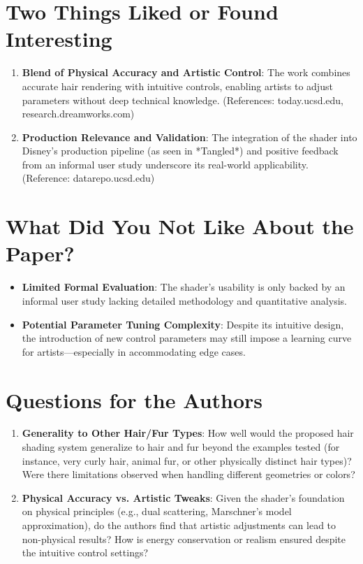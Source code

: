 \documentclass[12pt]{article}
\begin{document}
\section{Two Things Liked or Found Interesting}
\begin{enumerate}[noitemsep]
    \item \textbf{Blend of Physical Accuracy and Artistic Control}: The work combines accurate hair rendering with intuitive controls, enabling artists to adjust parameters without deep technical knowledge. (References: today.ucsd.edu, research.dreamworks.com)
    \item \textbf{Production Relevance and Validation}: The integration of the shader into Disney's production pipeline (as seen in *Tangled*) and positive feedback from an informal user study underscore its real-world applicability. (Reference: datarepo.ucsd.edu)
\end{enumerate}

\section{What Did You Not Like About the Paper?}
\begin{itemize}[noitemsep]
    \item \textbf{Limited Formal Evaluation}: The shader's usability is only backed by an informal user study lacking detailed methodology and quantitative analysis.
    \item \textbf{Potential Parameter Tuning Complexity}: Despite its intuitive design, the introduction of new control parameters may still impose a learning curve for artists—especially in accommodating edge cases.
\end{itemize}

\section{Questions for the Authors}
\begin{enumerate}[noitemsep]
    \item \textbf{Generality to Other Hair/Fur Types}: How well would the proposed hair shading system generalize to hair and fur beyond the examples tested (for instance, very curly hair, animal fur, or other physically distinct hair types)? Were there limitations observed when handling different geometries or colors?
    \item \textbf{Physical Accuracy vs. Artistic Tweaks}: Given the shader's foundation on physical principles (e.g., dual scattering, Marschner's model approximation), do the authors find that artistic adjustments can lead to non-physical results? How is energy conservation or realism ensured despite the intuitive control settings?
\end{enumerate}
\end{document}
